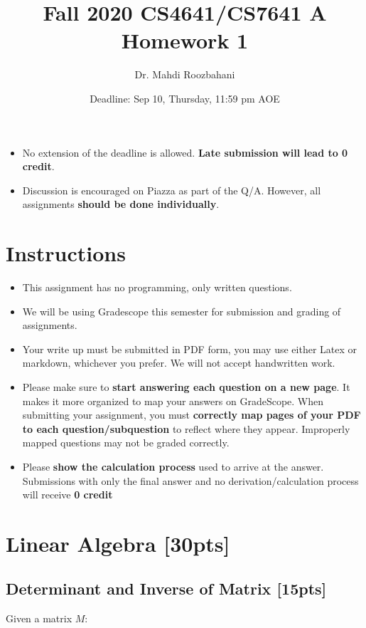 \documentclass{article}
\title{Fall 2020 CS4641/CS7641 A Homework 1}
\author{Dr. Mahdi Roozbahani}
\date{Deadline: Sep 10, Thursday, 11:59 pm AOE}
\begin{document}
\maketitle
\begin{itemize}
    \item No extension of the deadline is allowed. \textbf{Late submission will lead to 0 credit}.
    \item Discussion is encouraged on Piazza as part of the Q/A. However, all assignments \textbf{should be done individually}.
\end{itemize}

\section*{Instructions}
\begin{itemize}
    \item This assignment has no programming, only written questions.
    \item We will be using Gradescope this semester for submission and grading of assignments. 
    \item Your write up must be submitted in PDF form, you may use either Latex or markdown, whichever you prefer. We will not accept handwritten work.
    \item Please make sure to \textbf{start answering each question on a new page}. It makes it more organized to map your answers on GradeScope. When submitting your assignment, you must \textbf{correctly map pages of your PDF to each question/subquestion} to reflect where they appear. Improperly mapped questions may not be graded correctly.
    \item Please \textbf{show the calculation process} used to arrive at the answer. Submissions with only the final answer and no derivation/calculation process will receive \textbf{0 credit}

\end{itemize}
\section{Linear Algebra [30pts]}
\subsection{Determinant and Inverse of Matrix [15pts]}
Given a matrix $M$:
\end{document}
